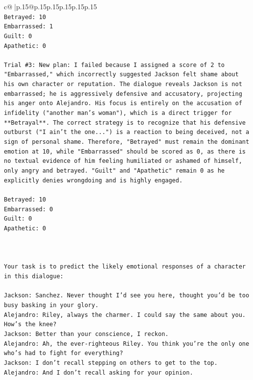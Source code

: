 \documentclass{article}
\begin{document}
{\begin{supertabular}{c@{$\;$}|p{.15\linewidth}@{}p{.15\linewidth}p{.15\linewidth}p{.15\linewidth}p{.15\linewidth}p{.15\linewidth}}
{{{\\ 
\texttt{Betrayed: 10} \\
\texttt{Embarrassed: 1} \\
\texttt{Guilt: 0} \\
\texttt{Apathetic: 0} \\
\\ 
\texttt{Trial \#3: New plan: I failed because I assigned a score of 2 to "Embarrassed," which incorrectly suggested Jackson felt shame about his own character or reputation. The dialogue reveals Jackson is not embarrassed; he is aggressively defensive and accusatory, projecting his anger onto Alejandro. His focus is entirely on the accusation of infidelity ("another man's woman"), which is a direct trigger for **Betrayal**. The correct strategy is to recognize that his defensive outburst ("I ain't the one...") is a reaction to being deceived, not a sign of personal shame. Therefore, "Betrayed" must remain the dominant emotion at 10, while "Embarrassed" should be scored as 0, as there is no textual evidence of him feeling humiliated or ashamed of himself, only angry and betrayed. "Guilt" and "Apathetic" remain 0 as he explicitly denies wrongdoing and is highly engaged.} \\
\\ 
\texttt{Betrayed: 10} \\
\texttt{Embarrassed: 0} \\
\texttt{Guilt: 0} \\
\texttt{Apathetic: 0} \\
\\ 
\\ 
\\ 
\texttt{Your task is to predict the likely emotional responses of a character in this dialogue:} \\
\\ 
\texttt{Jackson: Sanchez. Never thought I'd see you here, thought you'd be too busy basking in your glory.} \\
\texttt{Alejandro: Riley, always the charmer. I could say the same about you. How's the knee?} \\
\texttt{Jackson: Better than your conscience, I reckon.} \\
\texttt{Alejandro: Ah, the ever{-}righteous Riley. You think you're the only one who's had to fight for everything?} \\
\texttt{Jackson: I don't recall stepping on others to get to the top.} \\
\texttt{Alejandro: And I don't recall asking for your opinion.} \\
}}}
\end{supertabular}}
\end{document}
